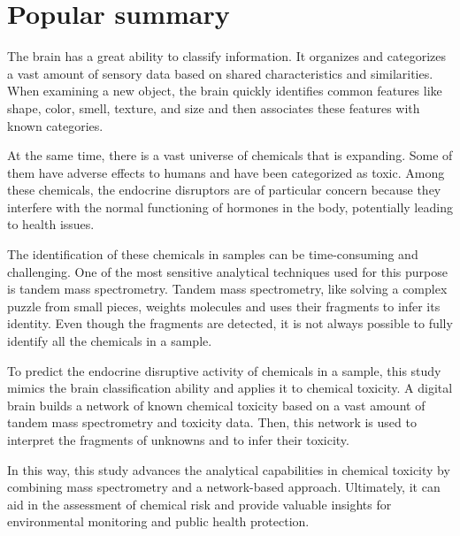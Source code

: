 \thispagestyle{plain}			%
\setlength{\parskip}{0pt plus 1.0pt}
\section*{Popular summary}

The brain has a great ability to classify information. It organizes and categorizes a vast amount of sensory data based on shared characteristics and similarities. When examining a new object, the brain quickly identifies common features like shape, color, smell, texture, and size and then associates these features with known categories. 

At the same time, there is a vast universe of chemicals that is expanding. Some of them have adverse effects to humans and have been categorized as toxic. Among these chemicals, the endocrine disruptors are of particular concern because they interfere with the normal functioning of hormones in the body, potentially leading to health issues. 

The identification of these chemicals in samples can be time-consuming and challenging. One of the most sensitive analytical techniques used for this purpose is tandem mass spectrometry. Tandem mass spectrometry, like solving a complex puzzle from small pieces, weights molecules and uses their fragments to infer its identity. Even though the fragments are detected, it is not always possible to fully identify all the chemicals in a sample.

To predict the endocrine disruptive activity of chemicals in a sample, this study mimics the brain classification ability and applies it to chemical toxicity. A digital brain builds a network of known chemical toxicity based on a vast amount of tandem mass spectrometry and toxicity data. Then, this network is used to interpret the fragments of unknowns and to infer their toxicity. 

In this way, this study advances the analytical capabilities in chemical toxicity by combining mass spectrometry and a network-based approach. Ultimately, it can aid in the assessment of chemical risk and provide valuable insights for environmental monitoring and public health protection.

